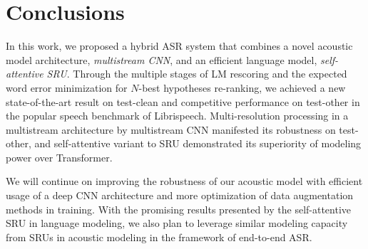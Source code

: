\documentclass[a4paper]{article}
\begin{document}
\section{Conclusions}
In this work, we proposed a hybrid ASR system that combines a novel acoustic model architecture, \emph{multistream CNN}, and an efficient language model, \emph{self-attentive SRU}. Through the multiple stages of LM rescoring and the expected word error minimization for $N$-best hypotheses re-ranking, we achieved a new state-of-the-art result on test-clean and competitive performance on test-other in the popular speech benchmark of Librispeech. Multi-resolution processing in a multistream architecture by multistream CNN manifested its robustness on test-other, and self-attentive variant to SRU demonstrated its superiority of modeling power over Transformer.

We will continue on improving the robustness of our acoustic model with efficient usage of a deep CNN architecture and more optimization of data augmentation methods in training. With the promising results presented by the self-attentive SRU in language modeling, we also plan to leverage similar modeling capacity from SRUs in acoustic modeling in the framework of end-to-end ASR.  









\end{document}

